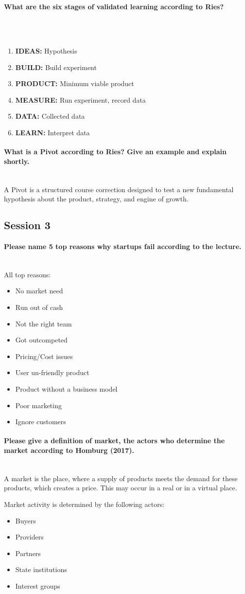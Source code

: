 \documentclass[10pt,a4paper,noendnumber=true]{scrartcl}
\newcommand{\properparagraph}[1]{\paragraph{\textcolor{Emerald}{#1}}\mbox{}\\}
\begin{document}
\properparagraph{What are the six stages of validated learning according to Ries?}
\\[-6ex]
\begin{enumerate}
	\item \textbf{IDEAS:} Hypothesis
	\item \textbf{BUILD:} Build experiment
	\item \textbf{PRODUCT:} Minimum viable product
	\item \textbf{MEASURE:} Run experiment, record data
	\item \textbf{DATA:} Collected data
	\item \textbf{LEARN:} Interpret data
\end{enumerate}

\properparagraph{What is a Pivot according to Ries? Give an example and explain shortly.}
A Pivot is a structured course correction designed to test a new fundamental hypothesis about the product, strategy, and engine of growth.






\newpage
\subsection{Session 3}
\properparagraph{Please name 5 top reasons why startups fail according to the lecture.}
All top reasons:
\begin{itemize}
	\item No market need
	\item Run out of cash
	\item Not the right team
	\item Got outcompeted
	\item Pricing/Cost issues
	\item User un-friendly product
	\item Product without a business model
	\item Poor marketing
	\item Ignore customers
\end{itemize}

\properparagraph{Please give a definition of market, the actors who determine the market according to Homburg	(2017).}
A market is the place, where a supply of products meets the demand for these products, which creates a price. This may occur in a real or in a virtual place.

Market activity is determined by the following actors:
\begin{itemize}
	\item Buyers
	\item Providers
	\item Partners
	\item State institutions
	\item Interest groups
\end{itemize}
\end{document}
